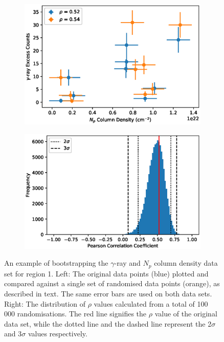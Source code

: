 \documentclass[12pt,a4paper]{article}
\begin{document}
\begin{figure}[H]
	\begin{subfigure}{0.47\textwidth}
		\centering
		\includegraphics[width=0.95\linewidth, height=0.22\textheight]{bootstrap_example}
	\end{subfigure}
	\begin{subfigure}{0.53\textwidth}
		\centering
		\includegraphics[width=0.95\linewidth, height=0.22\textheight]{gammopHI_reg1}
	\end{subfigure}
	\caption{An example of bootstrapping the $\gamma$-ray and $N_p$ column density data set for region 1. Left: The original data points (blue) plotted and compared against a single set of randomised data points (orange), as described in text. The same error bars are used on both data sets. Right: The distribution of $\rho$ values calculated from a total of 100 000 randomisations. The red line signifies the $\rho$ value of the original data set, while the dotted line and the dashed line represent the 2$\sigma$ and 3$\sigma$ values respectively.}
	\label{fig:bootstrap example}
\end{figure}
\end{document}

